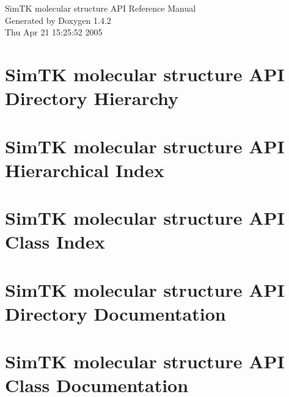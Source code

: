 \documentclass[a4paper]{book}
\begin{document}
\begin{titlepage}
\vspace*{7cm}
\begin{center}
{\Large Sim\-TK molecular structure API Reference Manual}\\
\vspace*{1cm}
{\large Generated by Doxygen 1.4.2}\\
\vspace*{0.5cm}
{\small Thu Apr 21 15:25:52 2005}\\
\end{center}
\end{titlepage}
\clearemptydoublepage
{}
\tableofcontents
\clearemptydoublepage
{}
\chapter{Sim\-TK molecular structure API Directory Hierarchy}

\chapter{Sim\-TK molecular structure API Hierarchical Index}

\chapter{Sim\-TK molecular structure API Class Index}

\chapter{Sim\-TK molecular structure API Directory Documentation}








\chapter{Sim\-TK molecular structure API Class Documentation}










\printindex
\end{document}
